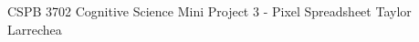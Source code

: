 \documentclass{Classes/solutionclass}
\begin{document}
\pretitle
{CSPB 3702}
{\normalsize{Cognitive Science}}
{\normalsize{Mini Project 3 - Pixel Spreadsheet}}
{Taylor Larrechea}
\makeatletter
    \startcontents[sections]
    \thispagestyle{fancy}
\makeatother
\vspace{-2em}

\end{document}
